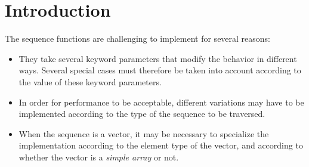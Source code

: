 \section{Introduction}

The \commonlisp{} \cite{ansi:common:lisp} sequence functions are
challenging to implement for several reasons:

\begin{itemize}
\item They take several keyword parameters that modify the behavior in
  different ways.  Several special cases must therefore be taken into
  account according to the value of these keyword parameters.
\item In order for performance to be acceptable, different variations
  may have to be implemented according to the type of the sequence to
  be traversed.
\item When the sequence is a vector, it may be necessary to specialize
  the implementation according to the element type of the vector, and
  according to whether the vector is a \emph{simple array} or not.
\end{itemize}

